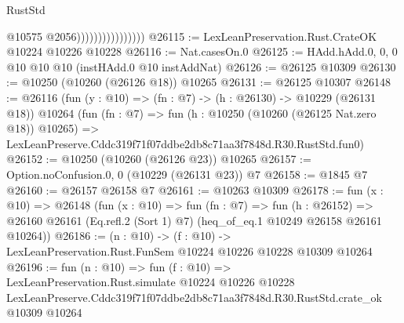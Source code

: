 \begin{lexlean}{RustStd}
\begin{coremodule}
                                    @10575
                                    @2056))))))))))))))))
@26115 := LexLeanPreservation.Rust.CrateOK @10224 @10226 @10228
@26116 := Nat.casesOn.{0}
@26125 := HAdd.hAdd.{0, 0, 0} @10 @10 @10 (instHAdd.{0} @10 instAddNat)
@26126 := @26125 @10309
@26130 := @10250 (@10260 (@26126 @18)) @10265
@26131 := @26125 @10307
@26148 := @26116
    (fun (y : @10) => (fn : @7) -> (h : @26130) -> @10229 (@26131 @18))
    @10264
    (fun (fn : @7) =>
    fun (h : @10250 (@10260 (@26125 Nat.zero @18)) @10265) =>
    LexLeanPreserve.Cddc319f71f07ddbe2db8c71aa3f7848d.R30.RustStd.fun0)
@26152 := @10250 (@10260 (@26126 @23)) @10265
@26157 := Option.noConfusion.{0, 0} (@10229 (@26131 @23)) @7
@26158 := @1845 @7
@26160 := @26157 @26158 @7
@26161 := @10263 @10309
@26178 := fun (x : @10) =>
  @26148
    (fun (x : @10) =>
    fun (fn : @7) =>
    fun (h : @26152) =>
    @26160 @26161 (Eq.refl.{2} (Sort 1) @7) (heq_of_eq.{1} @10249 @26158 @26161 @10264))
@26186 := (n : @10) ->
  (f : @10) -> LexLeanPreservation.Rust.FunSem @10224 @10226 @10228 @10309 @10264
@26196 := fun (n : @10) =>
  fun (f : @10) =>
  LexLeanPreservation.Rust.simulate
    @10224
    @10226
    @10228
    LexLeanPreserve.Cddc319f71f07ddbe2db8c71aa3f7848d.R30.RustStd.crate_ok
    @10309
    @10264
\end{coremodule}
\end{lexlean}
